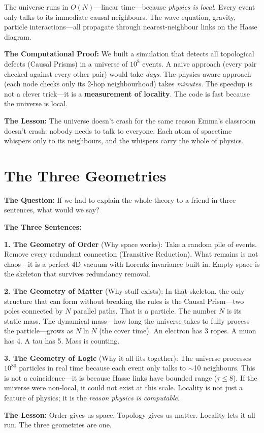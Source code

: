 \documentclass[11pt, a4paper, openany]{book}
\begin{document}
\begin{thoughtexp}
The universe runs in $O(N)$---linear time---because \emph{physics is local}. Every event only talks to its immediate causal neighbours. The wave equation, gravity, particle interactions---all propagate through nearest-neighbour links on the Hasse diagram.

\textbf{The Computational Proof:} We built a simulation that detects all topological defects (Causal Prisms) in a universe of $10^8$ events. A naive approach (every pair checked against every other pair) would take \emph{days}. The physics-aware approach (each node checks only its 2-hop neighbourhood) takes \emph{minutes}. The speedup is not a clever trick---it is a \textbf{measurement of locality}. The code is fast because the universe is local.

\textbf{The Lesson:} The universe doesn't crash for the same reason Emma's classroom doesn't crash: nobody needs to talk to everyone. Each atom of spacetime whispers only to its neighbours, and the whispers carry the whole of physics.
\end{thoughtexp}

\section{The Three Geometries}
\begin{thoughtexp}
\textbf{The Question:} If we had to explain the whole theory to a friend in three sentences, what would we say?

\textbf{The Three Sentences:}

\textbf{1. The Geometry of Order} (Why space works): Take a random pile of events. Remove every redundant connection (Transitive Reduction). What remains is not chaos---it is a perfect 4D vacuum with Lorentz invariance built in. Empty space is the skeleton that survives redundancy removal.

\textbf{2. The Geometry of Matter} (Why stuff exists): In that skeleton, the only structure that can form without breaking the rules is the Causal Prism---two poles connected by $N$ parallel paths. That is a particle. The number $N$ is its static mass. The dynamical mass---how long the universe takes to fully process the particle---grows as $N \ln N$ (the cover time). An electron has 3 ropes. A muon has 4. A tau has 5. Mass is counting.

\textbf{3. The Geometry of Logic} (Why it all fits together): The universe processes $10^{80}$ particles in real time because each event only talks to $\sim$10 neighbours. This is not a coincidence---it is because Hasse links have bounded range ($\tau \le 8$). If the universe were non-local, it could not exist at this scale. Locality is not just a feature of physics; it is the \emph{reason physics is computable}.

\textbf{The Lesson:} Order gives us space. Topology gives us matter. Locality lets it all run. The three geometries are one.
\end{thoughtexp}
\end{document}

